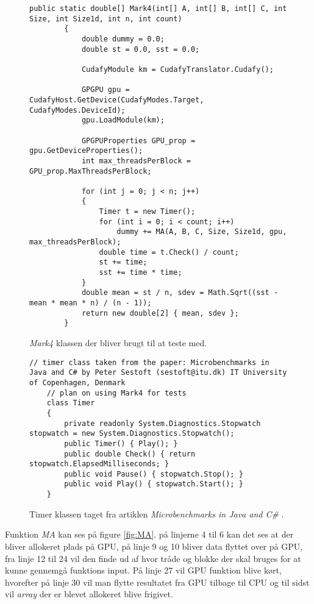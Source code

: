 \begin{figure}[h]
    \centering
    \lstset{style=sharpc}
	\begin{lstlisting}
public static double[] Mark4(int[] A, int[] B, int[] C, int Size, int Size1d, int n, int count)
        {
            double dummy = 0.0;
            double st = 0.0, sst = 0.0;

            CudafyModule km = CudafyTranslator.Cudafy();

            GPGPU gpu = CudafyHost.GetDevice(CudafyModes.Target, CudafyModes.DeviceId);
            gpu.LoadModule(km);

            GPGPUProperties GPU_prop = gpu.GetDeviceProperties();
            int max_threadsPerBlock = GPU_prop.MaxThreadsPerBlock;

            for (int j = 0; j < n; j++)
            {
                Timer t = new Timer();
                for (int i = 0; i < count; i++)
                    dummy += MA(A, B, C, Size, Size1d, gpu, max_threadsPerBlock);
                double time = t.Check() / count;
                st += time;
                sst += time * time;
            }
            double mean = st / n, sdev = Math.Sqrt((sst - mean * mean * n) / (n - 1));
            return new double[2] { mean, sdev };
        }
	\end{lstlisting}
    \caption{\textit{Mark4} klassen der bliver brugt til at teste med.}
    \label{fig:Mark4}
\end{figure}

\begin{figure}[h]
    \centering
    \lstset{style=sharpc}
	\begin{lstlisting}
// timer class taken from the paper: Microbenchmarks in Java and C# by Peter Sestoft (sestoft@itu.dk) IT University of Copenhagen, Denmark
    // plan on using Mark4 for tests
    class Timer
    {
        private readonly System.Diagnostics.Stopwatch stopwatch = new System.Diagnostics.Stopwatch();
        public Timer() { Play(); }
        public double Check() { return stopwatch.ElapsedMilliseconds; }
        public void Pause() { stopwatch.Stop(); }
        public void Play() { stopwatch.Start(); }
    }
	\end{lstlisting}
    \caption{Timer klassen taget fra artiklen \textit{Microbenchmarks in Java and C\#} \cite{Microbenchmarks}.}
    \label{fig:timer}
\end{figure}

Funktion \textit{MA} kan ses på figure \ref{fig:MA}. på linjerne 4 til 6 kan det ses at der bliver allokeret plads på GPU, på linje 9 og 10 bliver data flyttet over på GPU, fra linje 12 til 24 vil den finde ud af hvor tråde og blokke der skal bruges for at kunne gennemgå funktions input. På linje 27 vil GPU funktion blive kørt, hvorefter på linje 30 vil man flytte resultatet fra GPU tilbage til CPU og til sidst vil \textit{array} der er blevet allokeret blive frigivet.

